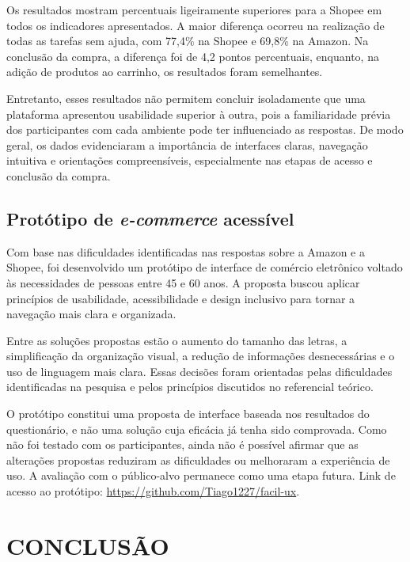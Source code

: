 \documentclass[12pt,a4paper]{article}
\begin{document}
Os resultados mostram percentuais ligeiramente superiores para a Shopee em todos os indicadores apresentados. A maior diferença ocorreu na realização de todas as tarefas sem ajuda, com 77,4\% na Shopee e 69,8\% na Amazon. Na conclusão da compra, a diferença foi de 4,2 pontos percentuais, enquanto, na adição de produtos ao carrinho, os resultados foram semelhantes.

Entretanto, esses resultados não permitem concluir isoladamente que uma plataforma apresentou usabilidade superior à outra, pois a familiaridade prévia dos participantes com cada ambiente pode ter influenciado as respostas. De modo geral, os dados evidenciaram a importância de interfaces claras, navegação intuitiva e orientações compreensíveis, especialmente nas etapas de acesso e conclusão da compra.

\subsection{Protótipo de \textit{e-commerce} acessível}

Com base nas dificuldades identificadas nas respostas sobre a Amazon e a Shopee, foi desenvolvido um protótipo de interface de comércio eletrônico voltado às necessidades de pessoas entre 45 e 60 anos. A proposta buscou aplicar princípios de usabilidade, acessibilidade e design inclusivo para tornar a navegação mais clara e organizada.

Entre as soluções propostas estão o aumento do tamanho das letras, a simplificação da organização visual, a redução de informações desnecessárias e o uso de linguagem mais clara. Essas decisões foram orientadas pelas dificuldades identificadas na pesquisa e pelos princípios discutidos no referencial teórico.

O protótipo constitui uma proposta de interface baseada nos resultados do questionário, e não uma solução cuja eficácia já tenha sido comprovada. Como não foi testado com os participantes, ainda não é possível afirmar que as alterações propostas reduziram as dificuldades ou melhoraram a experiência de uso. A avaliação com o público-alvo permanece como uma etapa futura. Link de acesso ao protótipo: \url{https://github.com/Tiago1227/facil-ux}.

\section{CONCLUSÃO}
\end{document}
